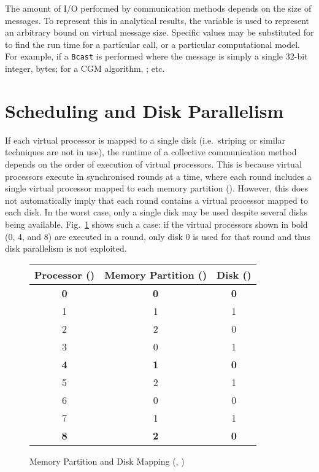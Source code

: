 \documentclass[12pt]{carletoncsthesis}
\begin{document}
The amount of I/O performed by communication methods depends on the
size of messages.  To represent this in analytical results, the variable
 is used to represent an arbitrary bound on virtual message size.
Specific values may be substituted for  to find the run time for
a particular call, or a particular computational model.  For example, if a
{\tt Bcast} is performed where the message is simply a single 32-bit integer,
 bytes; for a CGM algorithm, ; etc.


\section{Scheduling and Disk Parallelism}
\label{sched-par}


If each virtual processor is mapped to a single disk (i.e.\ striping or similar
techniques are not in use), the runtime of a collective communication method
depends on the order of execution of virtual processors.  This is because
virtual processors execute in synchronised rounds  at a time, where each
round includes a single virtual processor mapped to each memory partition
().  However, this does not automatically imply that each round
contains a virtual processor mapped to each disk.  In the worst case,
only a single disk may be used despite several disks being available.
Fig.~\ref{part-disk-mapping} shows such a case: if the virtual processors
shown in bold (0, 4, and 8) are executed in a round, only disk 0 is used
for that round and thus disk parallelism is not exploited.

\begin{figure}[ht]
\begin{center}
\begin{tabular}[]{c|c|c}
Processor () & Memory Partition () & Disk () \\ \hline
\textbf 0 & \textbf 0 & \textbf 0 \\
1         & 1         & 1 \\
2         & 2         & 0 \\
3         & 0         & 1 \\
\textbf 4 & \textbf 1 & \textbf 0 \\
5         & 2         & 1 \\
6         & 0         & 0 \\
7         & 1         & 1 \\
\textbf 8 & \textbf 2 & \textbf 0 \\
\end{tabular}
\end{center}
\caption{Memory Partition and Disk Mapping (, )}
\label{part-disk-mapping}
\end{figure}
\end{document}
